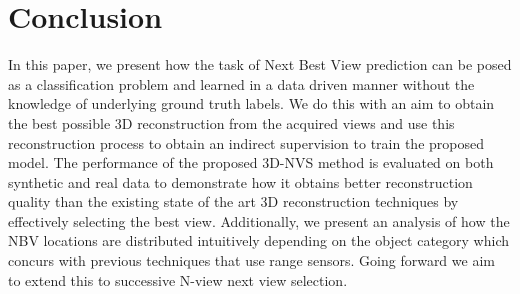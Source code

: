 \section{Conclusion}
In this paper, we present how the task of Next Best View prediction can be posed as a classification problem and learned in a data driven manner without the knowledge of underlying ground truth labels.
We do this with an aim to obtain the best possible 3D reconstruction from the acquired views and use this reconstruction process to obtain an indirect supervision to train the proposed model.
The performance of the proposed 3D-NVS method is evaluated on both synthetic and real data to demonstrate how it obtains better reconstruction quality than the existing state of the art 3D reconstruction techniques by effectively selecting the best view.
Additionally, we present an analysis of how the NBV locations are distributed intuitively depending on the object category which concurs with previous techniques that use range sensors.
Going forward we aim to extend this to successive N-view next view selection.



